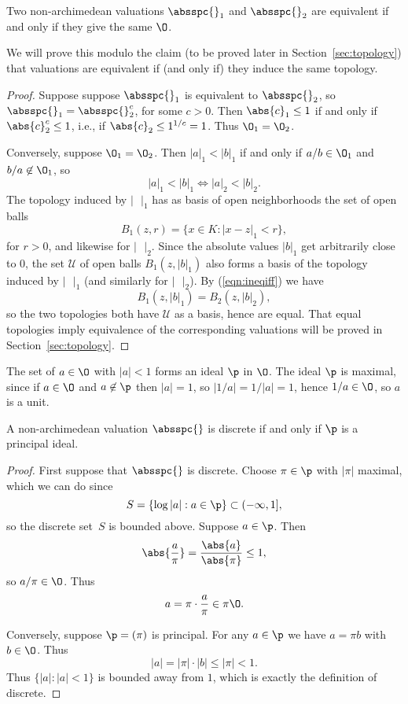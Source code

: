 \begin{lemma}
Two non-archimedean valuations $\absspc{}_1$ and 
$\absspc{}_2$ are equivalent if and only if they
give the same $\O$.
\end{lemma}
We will prove this modulo the claim (to 
be proved later in Section~\ref{sec:topology}) that 
valuations are equivalent if (and only if) they induce the 
same topology.
\begin{proof}
Suppose suppose $\absspc{}_1$ is equivalent to
$\absspc{}_2$, so $\absspc{}_1 = \absspc{}_2^c$,
for some $c>0$.  Then $\abs{c}_1 \leq 1$ if and only if
$\abs{c}_2^c \leq 1$, i.e., if $\abs{c}_2 \leq 1^{1/c}=1$.
Thus $\O_1 = \O_2$.

Conversely, suppose $\O_1 = \O_2$. 
Then $|a|_1<|b|_1$ if and only if $a/b\in \O_1$
and $b/a\not\in \O_1$, so 
\begin{equation}\label{eqn:ineqiff}
  |a|_1<|b|_1 \iff |a|_2 < |b|_2.
\end{equation}
The topology induced by $|\mbox{ }|_1$ has as basis
of open neighborhoods the set of open balls
$$
 B_1(z,r) = \{x \in K : |x-z|_1<r \},
$$
for $r>0$, and likewise for $|\mbox{ }|_2$.  Since 
the absolute values $|b|_1$ get arbitrarily close
to $0$, the set $\mathcal{U}$ of open balls $B_1(z,|b|_1)$ also 
forms a  basis of the topology induced
by $|\mbox{ }|_1$ (and similarly for $|\mbox{ }|_2$).
By (\ref{eqn:ineqiff}) we have
$$
 B_1(z,|b|_1) = B_2(z,|b|_2),
$$
so the two topologies both have $\mathcal{U}$ as
a basis, hence are equal.  That equal topologies
imply equivalence of the corresponding valuations
will be proved in Section~\ref{sec:topology}.
\end{proof}

The set of $a\in \O$ with $|a|<1$ forms an ideal $\p$ in $\O$.  The
ideal $\p$ is maximal, since if $a\in\O$ and $a\not\in\p$ then
$|a|=1$, so $|1/a| = 1/|a| = 1$, hence $1/a\in \O$, so $a$ is a unit.

\begin{lemma}\label{lem:discrete_principal}
A non-archimedean valuation $\absspc{}$ is
discrete if and only if $\p$ is a principal ideal.
\end{lemma}
\begin{proof}
First suppose that $\absspc{}$ is discrete.
Choose $\pi \in \p$ with $|\pi|$ maximal, which
we can do since 
$$
  S=\{\log|a| : a \in \p\} \subset (-\infty,1],
$$
so the discrete set~$S$ is bounded above.
Suppose $a\in \p$.   Then 
$$
  \abs{\frac{a}{\pi}} = \frac{\abs{a}}{\abs{\pi }} \leq 1,
$$
so $a/\pi\in \O$.
Thus $$a = \pi \cdot \frac{a}{\pi} \in \pi \O.$$

Conversely, suppose $\p=(\pi)$ is principal.  For any $a\in \p$
we have $a=\pi b$ with $b\in\O$.  Thus 
$$
  |a| = |\pi|\cdot |b| \leq |\pi| < 1.
$$
Thus $\{|a| : |a|<1\}$ is bounded away from $1$,
which is exactly the definition of discrete.
\end{proof}

